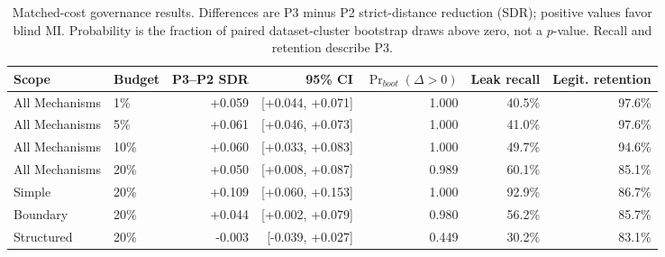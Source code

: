 \begin{table}[t]
\caption{Matched-cost governance results. Differences are P3 minus P2 strict-distance reduction (SDR); positive values favor blind MI. Probability is the fraction of paired dataset-cluster bootstrap draws above zero, not a $p$-value. Recall and retention describe P3.}
\label{tab:governance}
\centering\small
\begin{tabular}{llrrrrr}
\toprule
Scope & Budget & P3--P2 SDR & 95\% CI & $\Pr_{boot}(\Delta>0)$ & Leak recall & Legit. retention \\
\midrule
All Mechanisms & 1\% & +0.059 & [+0.044, +0.071] & 1.000 & 40.5\% & 97.6\% \\
All Mechanisms & 5\% & +0.061 & [+0.046, +0.073] & 1.000 & 41.0\% & 97.6\% \\
All Mechanisms & 10\% & +0.060 & [+0.033, +0.083] & 1.000 & 49.7\% & 94.6\% \\
All Mechanisms & 20\% & +0.050 & [+0.008, +0.087] & 0.989 & 60.1\% & 85.1\% \\
Simple & 20\% & +0.109 & [+0.060, +0.153] & 1.000 & 92.9\% & 86.7\% \\
Boundary & 20\% & +0.044 & [+0.002, +0.079] & 0.980 & 56.2\% & 85.7\% \\
Structured & 20\% & -0.003 & [-0.039, +0.027] & 0.449 & 30.2\% & 83.1\% \\
\bottomrule
\end{tabular}
\end{table}

